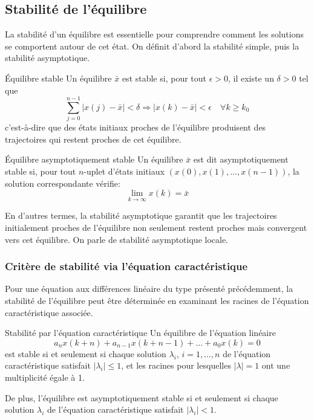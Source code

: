         \subsection{Stabilité de l'équilibre}
            La stabilité d'un équilibre est essentielle pour comprendre comment les solutions se comportent autour de cet état. On définit d'abord la stabilité simple, puis la stabilité asymptotique.
            \begin{definition}{Équilibre stable}
                Un équilibre $\bar{x}$ est stable si, pour tout $\epsilon > 0$, il existe un $\delta > 0$ tel que
                \begin{equation}
                    \sum_{j=0}^{n-1} |x(j)-\bar{x}| < \delta \Rightarrow |x(k)-\bar{x}| < \epsilon \quad \forall k \geq k_0
                \end{equation}
                c'est-à-dire que des états initiaux proches de l'équilibre produisent des trajectoires qui restent proches de cet équilibre.
            \end{definition}
            \begin{definition}{Équilibre asymptotiquement stable}
                Un équilibre $\bar{x}$ est dit asymptotiquement stable si, pour tout $n$-uplet d'états initiaux $(x(0), x(1), \dots, x(n-1))$, la solution correspondante vérifie:
                \begin{equation}
                    \lim_{k \to \infty} x(k) = \bar{x}
                \end{equation}
            \end{definition}
            En d'autres termes, la stabilité asymptotique garantit que les trajectoires initialement proches de l'équilibre non seulement restent proches mais convergent vers cet équilibre. On parle de stabilité asymptotique locale.
            
            \subsubsection{Critère de stabilité via l'équation caractéristique}
                Pour une équation aux différences linéaire du type présenté précédemment, la stabilité de l'équilibre peut être déterminée en examinant les racines de l'équation caractéristique associée.
                \begin{theorem}{Stabilité par l'équation caractéristique}
                    Un équilibre de l'équation linéaire 
                    \begin{equation}
                        a_n x(k+n)+a_{n-1} x(k+n-1)+\dots+a_0 x(k) = 0
                    \end{equation}
                    est stable si et seulement si chaque solution $\lambda_i$, $i=1, \dots, n$ de l'équation caractéristique satisfait $|\lambda_i| \leq 1$, et les racines pour lesquelles $|\lambda| = 1$ ont une multiplicité égale à 1.
                
                    De plus, l'équilibre est asymptotiquement stable si et seulement si chaque solution $\lambda_i$ de l'équation caractéristique satisfait $|\lambda_i| < 1$.
                \end{theorem}

